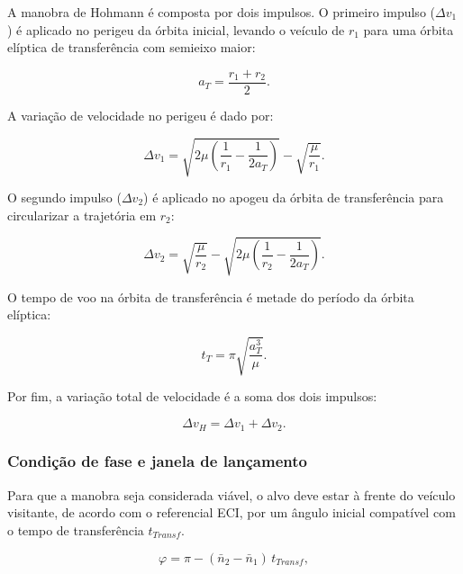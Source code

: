 A manobra de Hohmann é composta por dois impulsos.
O primeiro impulso ($\Delta v_1$) é aplicado no perigeu da órbita inicial, levando o veículo de $r_1$ para uma órbita elíptica de transferência com semieixo maior:

\begin{equation}
a_T = \frac{r_1+r_2}{2}.
\end{equation}

A variação de velocidade no perigeu é dado por:

\begin{equation}
\Delta v_1 = \sqrt{2\mu \left(\frac{1}{r_1} - \frac{1}{2a_T}\right)} - \sqrt{\frac{\mu}{r_1}}.
\end{equation}

O segundo impulso ($\Delta v_2$) é aplicado no apogeu da órbita de transferência para circularizar a trajetória em $r_2$:

\begin{equation}
\Delta v_2 = \sqrt{\frac{\mu}{r_2}} - \sqrt{2\mu \left(\frac{1}{r_2} - \frac{1}{2a_T}\right)}.
\end{equation}

O tempo de voo na órbita de transferência é metade do período da órbita elíptica:

\begin{equation}
t_T = \pi \sqrt{\frac{a_T^3}{\mu}}.
\end{equation}

Por fim, a variação total de velocidade é a soma dos dois impulsos:

\begin{equation}
\Delta v_{H} = \Delta v_1 + \Delta v_2.
\end{equation}

\subsubsection{Condição de fase e janela de lançamento}

Para que a manobra seja considerada viável, o alvo deve estar à frente do veículo visitante, de acordo com o referencial ECI, por um ângulo inicial compatível com o tempo de transferência $t_{Transf}$.

\begin{equation}
\varphi =
\pi - \left(\bar{n}_2 - \bar{n}_1\right)\,t_{Transf},
\end{equation}
